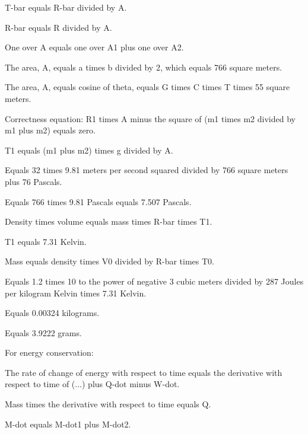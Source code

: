T-bar equals R-bar divided by A.

R-bar equals R divided by A.

One over A equals one over A1 plus one over A2.

The area, A, equals a times b divided by 2, which equals 766 square meters.

The area, A, equals cosine of theta, equals G times C times T times 55 square meters.

Correctness equation: R1 times A minus the square of (m1 times m2 divided by m1 plus m2) equals zero.

T1 equals (m1 plus m2) times g divided by A.

Equals 32 times 9.81 meters per second squared divided by 766 square meters plus 76 Pascals.

Equals 766 times 9.81 Pascals equals 7.507 Pascals.

Density times volume equals mass times R-bar times T1.

T1 equals 7.31 Kelvin.

Mass equals density times V0 divided by R-bar times T0.

Equals 1.2 times 10 to the power of negative 3 cubic meters divided by 287 Joules per kilogram Kelvin times 7.31 Kelvin.

Equals 0.00324 kilograms.

Equals 3.9222 grams.

For energy conservation:

The rate of change of energy with respect to time equals the derivative with respect to time of (...) plus Q-dot minus W-dot.

Mass times the derivative with respect to time equals Q.

M-dot equals M-dot1 plus M-dot2.
